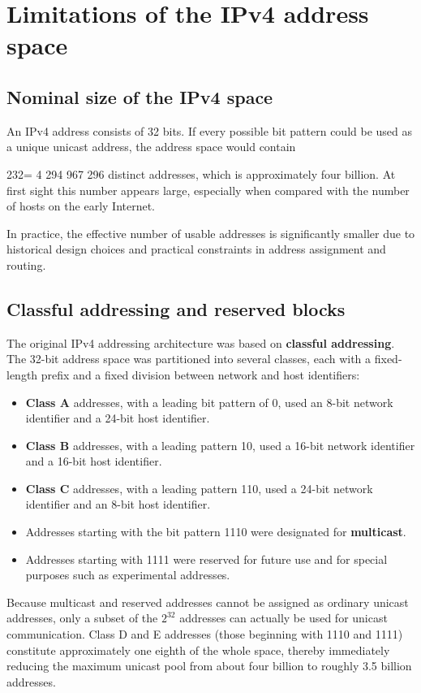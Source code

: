 \section{Limitations of the IPv4 address space}

\subsection{Nominal size of the IPv4 space}

An IPv4 address consists of 32 bits. If every possible bit pattern could be used as a unique unicast address, the address space would contain

232= 4 294 967 296 distinct addresses, which is approximately four billion. At first sight this number appears large, especially when compared with the number of hosts on the early Internet.

In practice, the effective number of usable addresses is significantly smaller due to historical design choices and practical constraints in address assignment and routing.

\subsection{Classful addressing and reserved blocks}

The original IPv4 addressing architecture was based on \textbf{classful addressing}. The 32-bit address space was partitioned into several classes, each with a fixed-length prefix and a fixed division between network and host identifiers:

\begin{itemize}
\item \textbf{Class A} addresses, with a leading bit pattern of 0, used an 8-bit network identifier and a 24-bit host identifier.
\item \textbf{Class B} addresses, with a leading pattern 10, used a 16-bit network identifier and a 16-bit host identifier.
\item \textbf{Class C} addresses, with a leading pattern 110, used a 24-bit network identifier and an 8-bit host identifier.
\item Addresses starting with the bit pattern 1110 were designated for \textbf{multicast}.
\item Addresses starting with 1111 were reserved for future use and for special purposes such as experimental addresses.
\end{itemize}

Because multicast and reserved addresses cannot be assigned as ordinary unicast addresses, only a subset of the $2^{32}$ addresses can actually be used for unicast communication. Class D and E addresses (those beginning with 1110 and 1111) constitute approximately one eighth of the whole space, thereby immediately reducing the maximum unicast pool from about four billion to roughly 3.5 billion addresses.

